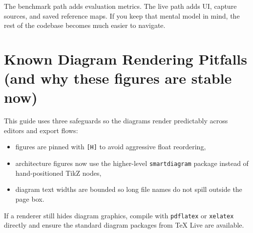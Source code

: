 \documentclass[11pt]{article}
\begin{document}
The benchmark path adds evaluation metrics. The live path adds UI, capture sources, and saved reference maps. If you keep that mental model in mind, the rest of the codebase becomes much easier to navigate.

\section{Known Diagram Rendering Pitfalls (and why these figures are stable now)}
This guide uses three safeguards so the diagrams render predictably across editors and export flows:

\begin{itemize}[leftmargin=*]
  \item figures are pinned with \texttt{[H]} to avoid aggressive float reordering,
  \item architecture figures now use the higher-level \texttt{smartdiagram} package instead of hand-positioned TikZ nodes,
  \item diagram text widths are bounded so long file names do not spill outside the page box.
\end{itemize}

If a renderer still hides diagram graphics, compile with \texttt{pdflatex} or \texttt{xelatex} directly and ensure the standard diagram packages from TeX Live are available.
\end{document}
